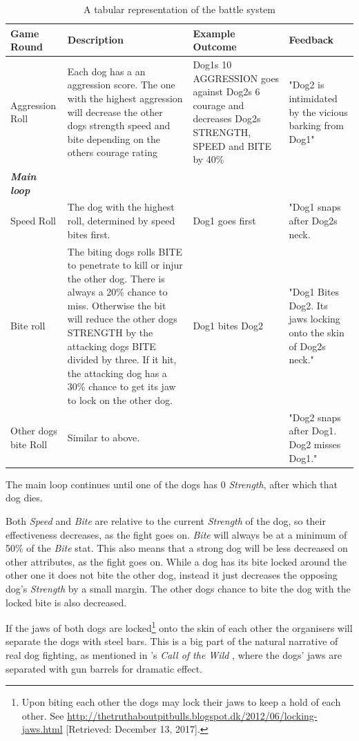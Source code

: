 \begin{table}[h]
\scriptsize 
	\begin{tabular}{|l|p{5cm}|p{3cm}|p{3cm}|} 
		\hline
		\textbf{Game Round} & \textbf{Description} & \textbf{Example Outcome} &\textbf{ Feedback }\\ [0.5ex] 
		\hline\hline
		Aggression Roll & Each dog has a an aggression score. The one with the highest aggression will decrease the other dogs strength speed and bite depending on the others courage rating & Dog1s 10 AGGRESSION goes against Dog2s 6 courage and decreases Dog2s STRENGTH, SPEED and BITE by 40\% & "Dog2 is intimidated by the vicious barking from Dog1" \\  
		\hline\hline
		\textit{\textbf{Main loop}} \\
		\hline
		Speed Roll	& The dog with the highest roll, determined by speed bites first. &	Dog1 goes first & "Dog1 snaps after Dog2s neck. \\
		\hline
		Bite roll & The biting dogs rolls BITE to penetrate to kill or injur the other dog. There is always a 20\% chance to miss. Otherwise the bit will reduce the other dogs STRENGTH by the attacking dogs BITE divided by three. If it hit, the attacking dog has a 30\% chance to get its jaw to lock on the other dog. & Dog1 bites Dog2 & "Dog1 Bites Dog2. Its jaws locking onto the skin of Dog2s neck." \\
		\hline
		Other dogs bite Roll & Similar to above. & & "Dog2 snaps after Dog1. Dog2 misses Dog1." \\
		\hline
	\end{tabular}
	\caption{\label{tab:stat}A tabular representation of the battle system}
\end{table}


The main loop continues until one of the dogs has 0 \textit{Strength}, after which that dog dies.\

Both \textit{Speed} and \textit{Bite} are relative to the current \textit{Strength} of the dog, so their effectiveness decreases, as the fight goes on. \textit{Bite} will always be at a minimum of 50\% of the \textit{Bite} stat. This also means that a strong dog will be less decreased on other attributes, as the fight goes on. While a dog has its bite locked around the other one it does not bite the other dog, instead it just decreases the opposing dog's \textit{Strength} by a small margin. The other dogs chance to bite the dog with the locked bite is also decreased.\

If the jaws of both dogs are locked\footnote{Upon biting each other the dogs may lock their jaws to keep a hold of each other. See  \url{http://thetruthaboutpitbulls.blogspot.dk/2012/06/locking-jaws.html} [Retrieved: December 13, 2017].} onto the skin of each other the organisers will separate the dogs with steel bars. This is a big part of the natural narrative of real dog fighting, as mentioned in \citeauthor{london1997call}'s \textit{Call of the Wild} \citeyearpar{london1997call}, where the dogs' jaws are separated with gun barrels for dramatic effect.\

